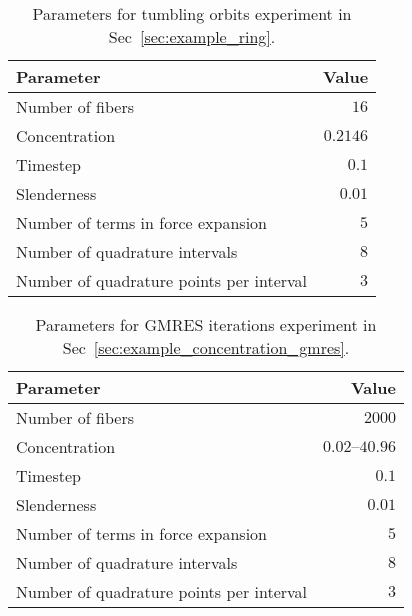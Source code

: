 \begin{table}[!htbp]
  \caption*{Parameters for tumbling orbits experiment in Sec~\ref{sec:example_ring}.}
  \begin{center}
    \begin{tabulary}{\textwidth}{LR}
      \toprule
      Parameter & Value \\
      \midrule
      Number of fibers & $16$ \\
      Concentration & $0.2146$ \\
      Timestep & $0.1$ \\
      Slenderness & $0.01$ \\
      Number of terms in force expansion & $5$ \\
      Number of quadrature intervals & $8$ \\
      Number of quadrature points per interval & $3$ \\
      \bottomrule
    \end{tabulary}
  \end{center}
\end{table}

\begin{table}[!htbp]
  \caption*{Parameters for GMRES iterations experiment in Sec~\ref{sec:example_concentration_gmres}.}
  \begin{center}
    \begin{tabulary}{\textwidth}{LR}
      \toprule
      Parameter & Value \\
      \midrule
      Number of fibers & $2000$ \\
      Concentration & $0.02–40.96$ \\
      Timestep & $0.1$ \\
      Slenderness & $0.01$ \\
      Number of terms in force expansion & $5$ \\
      Number of quadrature intervals & $8$ \\
      Number of quadrature points per interval & $3$ \\
      \bottomrule
    \end{tabulary}
  \end{center}
\end{table}

